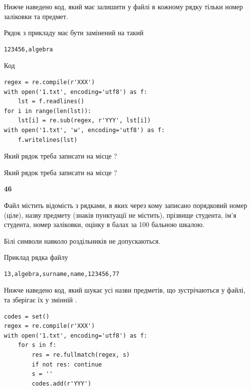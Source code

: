 Нижче наведено код, який має залишити у файлі в кожному рядку тільки номер заліковки та предмет.

Рядок з прикладу має бути замінений на такий



\begin{verbatim}
123456,algebra
\end{verbatim}




Код



\begin{verbatim}
regex = re.compile(r'XXX')
with open('1.txt', encoding='utf8') as f:
    lst = f.readlines()
for i in range(len(lst)):
    lst[i] = re.sub(regex, r'YYY', lst[i])
with open('1.txt', 'w', encoding='utf8') as f:
    f.writelines(lst)
\end{verbatim}









Який рядок треба записати на місце  ?\par
\vspace{5mm}


Який рядок треба записати на місце  ?\par


\newpage

{\begin {center}\textbf{ 46}\end {center}}\par
Файл  містить відомість з рядками, в яких через кому записано поряд\-ковий номер (ціле), назву предмету (знаків пунктуації не містить), прізвище студента, ім'я студента, номер заліковки, оцінку в балах за 100 бальною шкалою.

Білі символи навколо роздільників не допускаються.

Приклад рядка файлу



\begin{verbatim}
13,algebra,surname,name,123456,77
\end{verbatim}


Нижче наведено код, який шукає усі назви предметів, що зустрічаються у файлі, та зберігає їх у змінній .



\begin{verbatim}
codes = set()
regex = re.compile(r'XXX')
with open('1.txt', encoding='utf8') as f:
    for s in f:
        res = re.fullmatch(regex, s)
        if not res: continue
        s = ''
        codes.add(r'YYY')
\end{verbatim}





